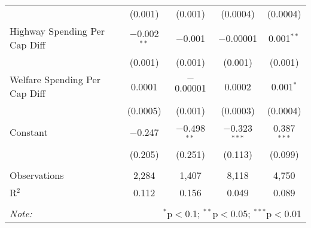 \begin{table}[!htbp]
\begin{tabular}{@{\extracolsep{5pt}}lcccc}
  & (0.001) & (0.001) & (0.0004) & (0.0004) \\ 
  Highway Spending Per Cap Diff & $-$0.002$^{**}$ & $-$0.001 & $-$0.00001 & 0.001$^{**}$ \\ 
  & (0.001) & (0.001) & (0.001) & (0.001) \\ 
  Welfare Spending Per Cap Diff & 0.0001 & $-$0.00001 & 0.0002 & 0.001$^{*}$ \\ 
  & (0.0005) & (0.001) & (0.0003) & (0.0004) \\ 
  Constant & $-$0.247 & $-$0.498$^{**}$ & $-$0.323$^{***}$ & 0.387$^{***}$ \\ 
  & (0.205) & (0.251) & (0.113) & (0.099) \\ 
 \hline \\[-1.8ex] 
Observations & 2,284 & 1,407 & 8,118 & 4,750 \\ 
R$^{2}$ & 0.112 & 0.156 & 0.049 & 0.089 \\ 
\hline 
\hline \\[-1.8ex] 
\textit{Note:}  & \multicolumn{4}{r}{$^{*}$p$<$0.1; $^{**}$p$<$0.05; $^{***}$p$<$0.01} \\ 
\end{tabular} 
\end{table} 
